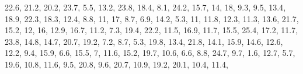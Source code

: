 \documentclass[]{book}
\newenvironment{Shaded}{\begin{snugshade}}{\end{snugshade}}
\newcommand{\DecValTok}[1]{\textcolor[rgb]{0.00,0.00,0.81}{#1}}
\newcommand{\FloatTok}[1]{\textcolor[rgb]{0.00,0.00,0.81}{#1}}
\newcommand{\NormalTok}[1]{#1}
\begin{document}
\begin{Shaded}
\begin{Highlighting}[]
    \FloatTok{22.6}\NormalTok{, }\FloatTok{21.2}\NormalTok{, }\FloatTok{20.2}\NormalTok{, }\FloatTok{23.7}\NormalTok{, }\FloatTok{5.5}\NormalTok{, }\FloatTok{13.2}\NormalTok{, }\FloatTok{23.8}\NormalTok{, }\FloatTok{18.4}\NormalTok{, }\FloatTok{8.1}\NormalTok{, }\FloatTok{24.2}\NormalTok{, }\FloatTok{15.7}\NormalTok{, }\DecValTok{14}\NormalTok{, }\DecValTok{18}\NormalTok{, }
    \FloatTok{9.3}\NormalTok{, }\FloatTok{9.5}\NormalTok{, }\FloatTok{13.4}\NormalTok{, }\FloatTok{18.9}\NormalTok{, }\FloatTok{22.3}\NormalTok{, }\FloatTok{18.3}\NormalTok{, }\FloatTok{12.4}\NormalTok{, }\FloatTok{8.8}\NormalTok{, }\DecValTok{11}\NormalTok{, }\DecValTok{17}\NormalTok{, }\FloatTok{8.7}\NormalTok{, }\FloatTok{6.9}\NormalTok{, }\FloatTok{14.2}\NormalTok{, }\FloatTok{5.3}\NormalTok{, }
    \DecValTok{11}\NormalTok{, }\FloatTok{11.8}\NormalTok{, }\FloatTok{12.3}\NormalTok{, }\FloatTok{11.3}\NormalTok{, }\FloatTok{13.6}\NormalTok{, }\FloatTok{21.7}\NormalTok{, }\FloatTok{15.2}\NormalTok{, }\DecValTok{12}\NormalTok{, }\DecValTok{16}\NormalTok{, }\FloatTok{12.9}\NormalTok{, }\FloatTok{16.7}\NormalTok{, }\FloatTok{11.2}\NormalTok{, }\FloatTok{7.3}\NormalTok{, }\FloatTok{19.4}\NormalTok{, }
    \FloatTok{22.2}\NormalTok{, }\FloatTok{11.5}\NormalTok{, }\FloatTok{16.9}\NormalTok{, }\FloatTok{11.7}\NormalTok{, }\FloatTok{15.5}\NormalTok{, }\FloatTok{25.4}\NormalTok{, }\FloatTok{17.2}\NormalTok{, }\FloatTok{11.7}\NormalTok{, }\FloatTok{23.8}\NormalTok{, }\FloatTok{14.8}\NormalTok{, }\FloatTok{14.7}\NormalTok{, }\FloatTok{20.7}\NormalTok{, }
    \FloatTok{19.2}\NormalTok{, }\FloatTok{7.2}\NormalTok{, }\FloatTok{8.7}\NormalTok{, }\FloatTok{5.3}\NormalTok{, }\FloatTok{19.8}\NormalTok{, }\FloatTok{13.4}\NormalTok{, }\FloatTok{21.8}\NormalTok{, }\FloatTok{14.1}\NormalTok{, }\FloatTok{15.9}\NormalTok{, }\FloatTok{14.6}\NormalTok{, }\FloatTok{12.6}\NormalTok{, }\FloatTok{12.2}\NormalTok{, }\FloatTok{9.4}\NormalTok{, }
    \FloatTok{15.9}\NormalTok{, }\FloatTok{6.6}\NormalTok{, }\FloatTok{15.5}\NormalTok{, }\DecValTok{7}\NormalTok{, }\FloatTok{11.6}\NormalTok{, }\FloatTok{15.2}\NormalTok{, }\FloatTok{19.7}\NormalTok{, }\FloatTok{10.6}\NormalTok{, }\FloatTok{6.6}\NormalTok{, }\FloatTok{8.8}\NormalTok{, }\FloatTok{24.7}\NormalTok{, }\FloatTok{9.7}\NormalTok{, }\FloatTok{1.6}\NormalTok{, }\FloatTok{12.7}\NormalTok{, }
    \FloatTok{5.7}\NormalTok{, }\FloatTok{19.6}\NormalTok{, }\FloatTok{10.8}\NormalTok{, }\FloatTok{11.6}\NormalTok{, }\FloatTok{9.5}\NormalTok{, }\FloatTok{20.8}\NormalTok{, }\FloatTok{9.6}\NormalTok{, }\FloatTok{20.7}\NormalTok{, }\FloatTok{10.9}\NormalTok{, }\FloatTok{19.2}\NormalTok{, }\FloatTok{20.1}\NormalTok{, }\FloatTok{10.4}\NormalTok{, }\FloatTok{11.4}\NormalTok{, }

\end{Highlighting}
\end{Shaded}
\end{document}
